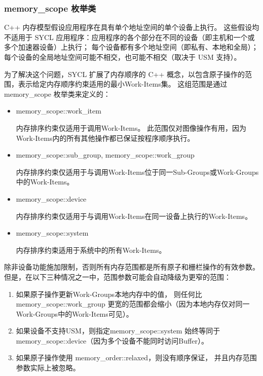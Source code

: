\subsubsection{memory\_scope 枚举类}
C++ 内存模型假设应用程序在具有单个地址空间的单个设备上执行。 
这些假设均不适用于 SYCL 应用程序：应用程序的各个部分在不同的设备（即主机和一个或多个加速器设备）上执行； 
每个设备都有多个地址空间（即私有、本地和全局）； 
每个设备的全局地址空间可能不相交，也可能不相交（取决于 USM 支持）。

为了解决这个问题，SYCL 扩展了内存顺序的 C++ 概念，以包含原子操作的范围，表示给定内存顺序约束适用的最小Work-Items集。 
这组范围是通过 memory\_scope 枚举类来定义的：

\begin{itemize}
	\item memory\_scope::work\_item

内存排序约束仅适用于调用Work-Items。 此范围仅对图像操作有用，因为Work-Items内的所有其他操作都已保证按程序顺序执行。

	\item memory\_scope::sub\_group, memory\_scope::work\_group

内存排序约束仅适用于与调用Work-Items位于同一Sub-Groups或Work-Groups中的Work-Items。

	\item memory\_scope::device

内存排序约束仅适用于与调用Work-Items在同一设备上执行的Work-Items。

	\item memory\_scope::system

内存排序约束适用于系统中的所有Work-Items。
\end{itemize}

除非设备功能施加限制，否则所有内存范围都是所有原子和栅栏操作的有效参数。 
但是，在以下三种情况之一中，范围参数可能会自动降级为更窄的范围：

\begin{enumerate}
	\item 如果原子操作更新Work-Groups本地内存中的值，
	则任何比 memory\_scope::work\_group 更宽的范围都会缩小（因为本地内存仅对同一Work-Groups中的Work-Items可见）。

	\item 如果设备不支持USM，则指定memory\_scope::system 
	始终等同于memory\_scope::device（因为多个设备不能同时访问Buffer）。

	\item 如果原子操作使用 memory\_order::relaxed，则没有顺序保证，
	并且内存范围参数实际上被忽略。
\end{enumerate}

